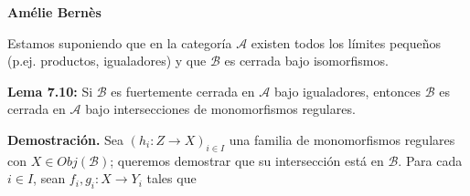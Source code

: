 \documentclass[10pt]{article}
\begin{document}
\begin{flushright}
\textbf{Amélie Bernès}
\end{flushright}

Estamos suponiendo que en la categoría $\mathcal{A}$ existen todos los 
límites pequeños (p.ej. productos, igualadores) y que $\mathcal{B}$
es cerrada bajo isomorfismos.

\vspace{0.2cm}
\textbf{Lema 7.10:} Si $\mathcal{B}$ es fuertemente cerrada en 
$\mathcal{A}$ bajo igualadores, entonces $\mathcal{B}$ es cerrada en 
$\mathcal{A}$ bajo intersecciones de monomorfismos regulares.
\noindent

\textbf{Demostración.}
Sea $(h_{i}: Z \longrightarrow X)_{i \in I}$ una familia de monomorfismos
regulares con $X \in Obj(\mathcal{B})$; queremos demostrar que su intersección
está en $\mathcal{B}$. Para cada $i \in I$, sean 
$f_{i}, g_{i}: X \longrightarrow Y_{i}$ tales que 
\end{document}
